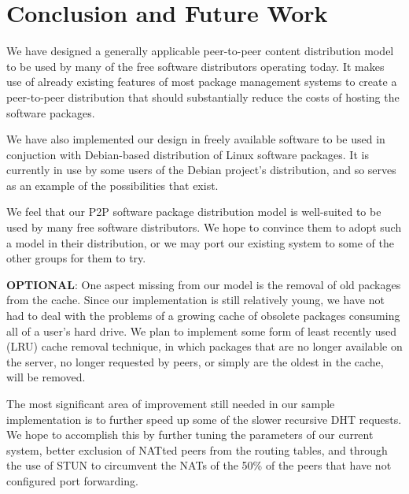 \documentclass[conference]{IEEEtran}
\begin{document}

\section{Conclusion and Future Work}
\label{conclusions}

We have designed a generally applicable peer-to-peer content
distribution model to be used by many of the free software
distributors operating today. It makes use of already existing
features of most package management systems to create a
peer-to-peer distribution that should substantially reduce the costs
of hosting the software packages.

We have also implemented our design in freely available software to
be used in conjuction with Debian-based distribution of Linux
software packages. It is currently in use by some users of the
Debian project's distribution, and so serves as an example of the
possibilities that exist.

We feel that our P2P software package distribution model is
well-suited to be used by many free software distributors. We hope
to convince them to adopt such a model in their distribution, or we
may port our existing system to some of the other groups for them to
try.

\textbf{OPTIONAL}: One aspect missing from our model is the removal of old packages
from the cache. Since our implementation is still relatively young,
we have not had to deal with the problems of a growing cache of
obsolete packages consuming all of a user's hard drive. We plan to
implement some form of least recently used (LRU) cache removal
technique, in which packages that are no longer available on the
server, no longer requested by peers, or simply are the oldest in
the cache, will be removed.

The most significant area of improvement still needed in our sample
implementation is to further speed up some of the slower recursive
DHT requests. We hope to accomplish this by further tuning the
parameters of our current system, better exclusion of NATted peers
from the routing tables, and through the use of STUN \cite{STUN} to
circumvent the NATs of the 50\% of the peers that have not
configured port forwarding.



\end{document}
